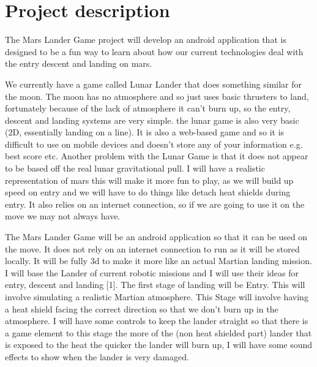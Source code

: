 \documentclass[11pt,fleqn,twoside]{article}
\begin{document}
\mmp
\setcounter{tocdepth}{3} %

\section{Project description}
The Mars Lander Game project will develop an android application that is designed to be a fun way to learn about how our current technologies deal with the entry descent and landing on mars.

We currently have a game called Lunar Lander that does something similar for the moon. The moon has no atmosphere and so just uses basic thrusters to land, fortunately because of the lack of atmosphere it can't burn up, so the entry, descent and landing systems are very simple. the lunar game is also very basic (2D, essentially landing on a line). It is also a web-based game and so it is difficult to use on mobile devices and doesn’t store any of your information e.g. best score etc. Another problem with the Lunar Game is that it does not appear to be based off the real lunar gravitational pull. I will have a realistic representation of mars this will make it more fun to play, as we will build up speed on entry and we will have to do things like detach heat shields during entry. It also relies on an internet connection, so if we are going to use it on the move we may not always have.

The Mars Lander Game will be an android application so that it can be used on the move. It does not rely on an internet connection to run as it will be stored locally. It will be fully 3d to make it more like an actual Martian landing mission. I will base the Lander of current robotic missions and I will use their ideas for entry, descent and landing [1]. The first stage of landing will be Entry. This will involve simulating a realistic Martian atmosphere. This Stage will involve having a heat shield facing the correct direction so that we don't burn up in the atmosphere. I will have some controls to keep the lander straight so that there is a game element to this stage the more of the (non heat shielded part) lander that is exposed to the heat the quicker the lander will burn up, I will have some sound effects to show when the lander is very damaged.
\end{document}
